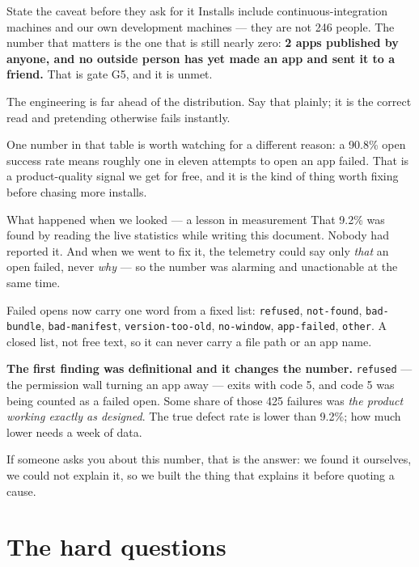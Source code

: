 \documentclass[11pt,a4paper]{report}
\begin{document}
\begin{warnbox}{State the caveat before they ask for it}
Installs include continuous-integration machines and our own development
machines --- they are not 246 people. The number that matters is the one
that is still nearly zero: \textbf{2 apps published by anyone, and no
outside person has yet made an app and sent it to a friend.} That is gate
G5, and it is unmet.

The engineering is far ahead of the distribution. Say that plainly; it is
the correct read and pretending otherwise fails instantly.
\end{warnbox}

One number in that table is worth watching for a different reason: a 90.8\%
open success rate means roughly one in eleven attempts to open an app
failed. That is a product-quality signal we get for free, and it is the
kind of thing worth fixing before chasing more installs.

\begin{plainbox}{What happened when we looked --- a lesson in measurement}
That 9.2\% was found by reading the live statistics while writing this
document. Nobody had reported it. And when we went to fix it, the
telemetry could say only \emph{that} an open failed, never \emph{why} ---
so the number was alarming and unactionable at the same time.

Failed opens now carry one word from a fixed list: \texttt{refused},
\texttt{not-found}, \texttt{bad-bundle}, \texttt{bad-manifest},
\texttt{version-too-old}, \texttt{no-window}, \texttt{app-failed},
\texttt{other}. A closed list, not free text, so it can never carry a file
path or an app name.

\textbf{The first finding was definitional and it changes the number.}
\texttt{refused} --- the permission wall turning an app away --- exits with
code 5, and code 5 was being counted as a failed open. Some share of those
425 failures was \emph{the product working exactly as designed}. The true
defect rate is lower than 9.2\%; how much lower needs a week of data.

If someone asks you about this number, that is the answer: we found it
ourselves, we could not explain it, so we built the thing that explains it
before quoting a cause.
\end{plainbox}

\section{The hard questions}
\end{document}
